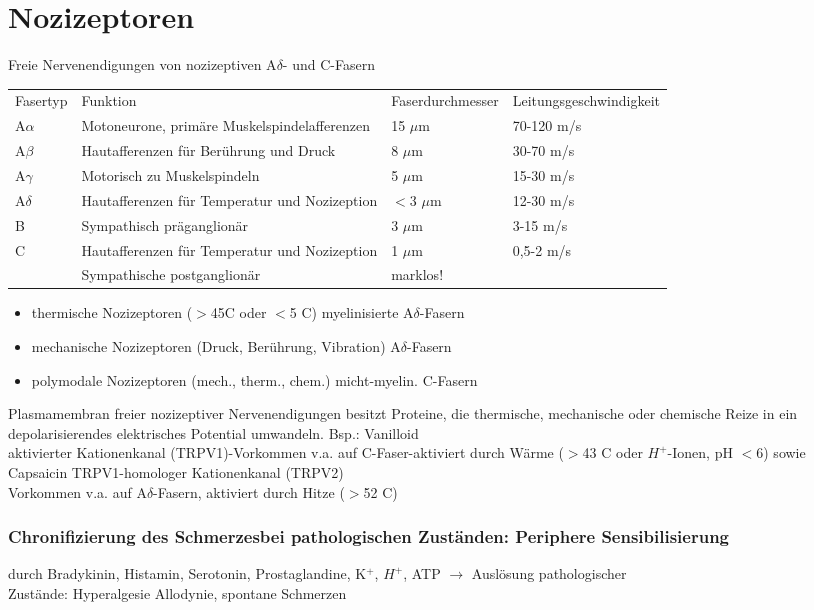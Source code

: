 \documentclass[10pt,a4paper]{report}
\begin{document}
\section{Nozizeptoren} %
\label{sec:nozizeptoren}
Freie Nervenendigungen von nozizeptiven A$\delta$- und C-Fasern\\
\begin{tabularx}{\textwidth}{XXXX}
Fasertyp&Funktion&Faserdurchmesser&Leitungsgeschwindigkeit\\
A$\alpha$&Motoneurone, primäre Muskelspindelafferenzen&15 $\mu$m&70-120 m/s\\
A$\beta$&Hautafferenzen für Berührung und Druck&8 $\mu$m&30-70 m/s\\
A$\gamma$&Motorisch zu Muskelspindeln&5 $\mu$m&15-30 m/s\\
A$\delta$&Hautafferenzen für Temperatur und Nozizeption&$<$3 $\mu$m&12-30 m/s\\
B&Sympathisch präganglionär&3 $\mu$m&3-15 m/s\\
C&Hautafferenzen für Temperatur und Nozizeption&1 $\mu$m&0,5-2 m/s\\
&Sympathische postganglionär&marklos!&\\
\end{tabularx}
\begin{itemize}
	\item thermische Nozizeptoren ($>$45\degree C oder $<$5 \degree C) myelinisierte A$\delta$-Fasern
	\item mechanische Nozizeptoren (Druck, Berührung, Vibration) A$\delta$-Fasern
	\item polymodale Nozizeptoren (mech., therm., chem.) micht-myelin. C-Fasern
\end{itemize}
Plasmamembran freier nozizeptiver Nervenendigungen besitzt Proteine, die thermische, mechanische oder chemische Reize in ein depolarisierendes elektrisches Potential umwandeln.
Bsp.: Vanilloid\\
aktivierter Kationenkanal (TRPV1)-Vorkommen v.a. auf C-Faser-aktiviert durch Wärme ($>$43 \degree C oder $H^+$-Ionen, pH $<$6) sowie Capsaicin TRPV1-homologer Kationenkanal (TRPV2)\\
Vorkommen v.a. auf A$\delta$-Fasern, aktiviert durch Hitze ($>$52 \degree C)
\subsubsection{Chronifizierung des Schmerzesbei pathologischen Zuständen: Periphere Sensibilisierung } %
\label{par:chronifizierung_des_schmerzesbei_pathologischen_zust_nden_periphere_sensibilisierung_}
durch Bradykinin, Histamin, Serotonin, Prostaglandine, K$^+$, $H^+$, ATP $\rightarrow$ Auslösung pathologischer \\
Zustände: Hyperalgesie Allodynie, spontane Schmerzen
\end{document}
